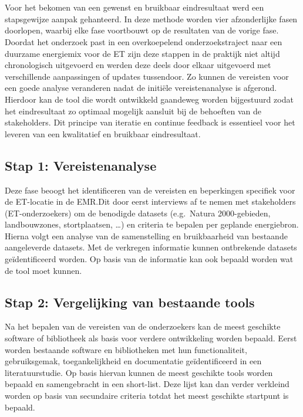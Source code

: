 
\chapter{}\label{ch:methodologie}

Voor het bekomen van een gewenst en bruikbaar eindresultaat werd een stapsgewijze aanpak gehanteerd. In deze methode worden vier afzonderlijke fasen doorlopen, waarbij elke fase voortbouwt op de resultaten van de vorige fase. Doordat het onderzoek past in een overkoepelend onderzoekstraject naar een duurzame energiemix voor de ET zijn deze stappen in de praktijk niet altijd chronologisch uitgevoerd en werden deze deels door elkaar uitgevoerd met verschillende aanpassingen of updates tussendoor. Zo kunnen de vereisten voor een goede analyse veranderen nadat de initiële vereistenanalyse is afgerond. Hierdoor kan de tool die wordt ontwikkeld gaandeweg worden bijgestuurd zodat het eindresultaat zo optimaal mogelijk aansluit bij de behoeften van de stakeholders. Dit principe van iteratie en continue feedback is essentieel voor het leveren van een kwalitatief en bruikbaar eindresultaat.

\section{Stap 1: Vereistenanalyse}
Deze fase beoogt het identificeren van de vereisten en beperkingen specifiek voor de ET-locatie in de EMR.\@ Dit door eerst interviews af te nemen met stakeholders (ET-onderzoekers) om de benodigde datasets (e.g.\ Natura 2000-gebieden, landbouwzones, stortplaatsen, \ldots) en criteria te bepalen per geplande energiebron. Hierna volgt een analyse van de samenstelling en bruikbaarheid van bestaande aangeleverde datasets. Met de verkregen informatie kunnen ontbrekende datasets geïdentificeerd worden. Op basis van de informatie kan ook bepaald worden wat de tool moet kunnen.

\section{Stap 2: Vergelijking van bestaande tools}
Na het bepalen van de vereisten van de onderzoekers kan de meest geschikte software of bibliotheek als basis voor verdere ontwikkeling worden bepaald. Eerst worden bestaande software en bibliotheken met hun functionaliteit, gebruiksgemak, toegankelijkheid en documentatie geïdentificeerd in een literatuurstudie. Op basis hiervan kunnen de meest geschikte tools worden bepaald en samengebracht in een short-list. Deze lijst kan dan verder verkleind worden op basis van secundaire criteria totdat het meest geschikte startpunt is bepaald.

